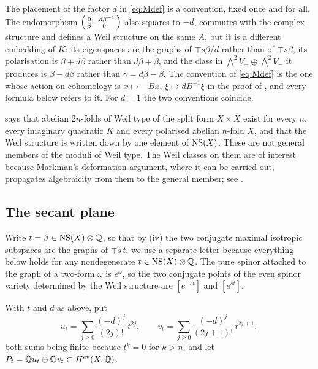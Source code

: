 The placement of the factor $d$ in \eqref{eq:Mdef} is a convention, fixed once
and for all. The endomorphism $\begin{psmallmatrix}0&-d\beta^{-1}\\
\beta&0\end{psmallmatrix}$ also squares to $-d$, commutes with the complex
structure and defines a Weil structure on the same $A$, but it is a different
embedding of $K$: its eigenspaces are the graphs of $\mp s\beta/d$ rather
than of $\mp s\beta$, its polarisation is $\beta+d\widehat\beta$ rather than
$d\beta+\widehat\beta$, and the class in
$\bigwedge^{2}V_{+}\oplus\bigwedge^{2}V_{-}$ it produces is
$\beta-d\widehat\beta$ rather than $\gamma=d\beta-\widehat\beta$. The
convention of \eqref{eq:Mdef} is the one whose action on cohomology is
$x\mapsto-Bx$, $\xi\mapsto dB^{-1}\xi$ in the proof of
, and every formula below refers to it. For $d=1$ the
two conventions coincide.

\begin{remark}\label{rem:abundant}
 says that abelian $2n$-folds of Weil type of the split
form $X\times\widehat{X}$ exist for every $n$, every imaginary quadratic $K$
and every polarised abelian $n$-fold $X$, and that the Weil structure is
written down by one element of $\mathrm{NS}(X)$. These are not general members of the
moduli of Weil type. The Weil classes on them are of interest because
Markman's deformation argument, where it can be carried out, propagates
algebraicity from them to the general member; see .
\end{remark}

\subsection{The secant plane}

Write $t=\beta\in\mathrm{NS}(X)\otimes\mathbb{Q}$, so that by
(iv) the two conjugate maximal isotropic subspaces are
the graphs of $\mp s\,t$; we use a separate letter because everything below
holds for any nondegenerate $t\in\mathrm{NS}(X)\otimes\mathbb{Q}$. The pure spinor
attached to the graph of a two-form $\omega$ is $e^{\omega}$, so the two
conjugate points of the even spinor variety determined by the Weil structure
are $[e^{-st}]$ and $[e^{st}]$.

\begin{definition}\label{def:secantplane}
With $t$ and $d$ as above, put
\begin{equation}\label{eq:uv}
  u_{t}=\sum_{j\ge0}\frac{(-d)^{j}}{(2j)!}\,t^{2j},
  \qquad
  v_{t}=\sum_{j\ge0}\frac{(-d)^{j}}{(2j+1)!}\,t^{2j+1},
\end{equation}
both sums being finite because $t^{k}=0$ for $k>n$, and let
$P_{t}=\mathbb{Q} u_{t}\oplus\mathbb{Q} v_{t}\subset H^{\mathrm{ev}}(X,\mathbb{Q})$.
\end{definition}

